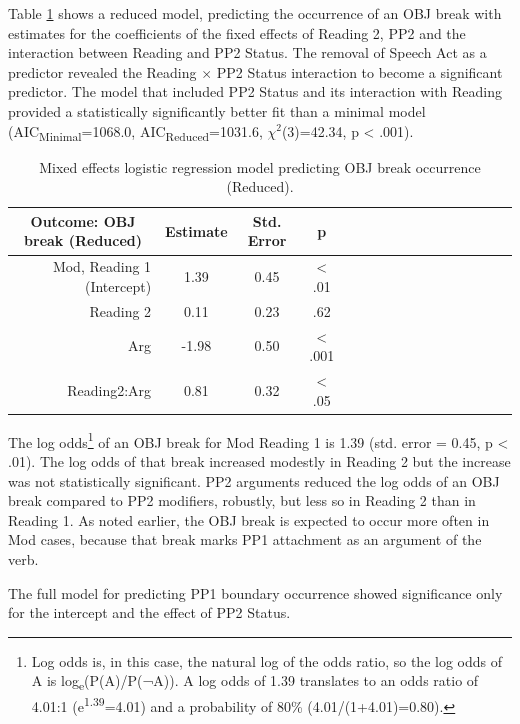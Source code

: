 \documentclass[11pt,oneside]{book}
\let\rmarkdownfootnote\footnote%
\def\footnote{\protect\rmarkdownfootnote}
\begin{document}
Table \ref{tab:objMod} shows a reduced model, predicting the occurrence of an OBJ break with estimates for the coefficients of the fixed effects of Reading 2, PP2 and the interaction between Reading and PP2 Status. The removal of Speech Act as a predictor revealed the Reading \(\times\) PP2 Status interaction to become a significant predictor. The model that included PP2 Status and its interaction with Reading provided a statistically significantly better fit than a minimal model (AIC\textsubscript{Minimal}=1068.0, AIC\textsubscript{Reduced}=1031.6, \(\chi^2\)(3)=42.34, p \textless{} .001).

\begin{table}[!h]

\caption{\label{tab:objMod}Mixed effects logistic regression model predicting OBJ break occurrence (Reduced).}
\centering
\begin{tabular}{rcccrcccrcccrccc}
\toprule
\multicolumn{1}{c}{Outcome: OBJ break (Reduced)} & \multicolumn{1}{c}{Estimate} & \multicolumn{1}{c}{Std. Error} & \multicolumn{1}{c}{p}\\
\midrule
Mod, Reading 1 (Intercept) & 1.39 & 0.45 & < .01\\
Reading 2 & 0.11 & 0.23 & .62\\
Arg & -1.98 & 0.50 & < .001\\
Reading2:Arg & 0.81 & 0.32 & < .05\\
\bottomrule
\end{tabular}
\end{table}

The log odds\footnote{Log odds is, in this case, the natural log of the odds ratio, so the log odds of A is log\textsubscript{e}(P(A)/P(¬A)). A log odds of 1.39 translates to an odds ratio of 4.01:1 (e\textsuperscript{1.39}=4.01) and a probability of 80\% (4.01/(1+4.01)=0.80).} of an OBJ break for Mod Reading 1 is 1.39 (std. error = 0.45, p \textless{} .01). The log odds of that break increased modestly in Reading 2 but the increase was not statistically significant. PP2 arguments reduced the log odds of an OBJ break compared to PP2 modifiers, robustly, but less so in Reading 2 than in Reading 1. As noted earlier, the OBJ break is expected to occur more often in Mod cases, because that break marks PP1 attachment as an argument of the verb.

The full model for predicting PP1 boundary occurrence showed significance only for the intercept and the effect of PP2 Status.
\end{document}
